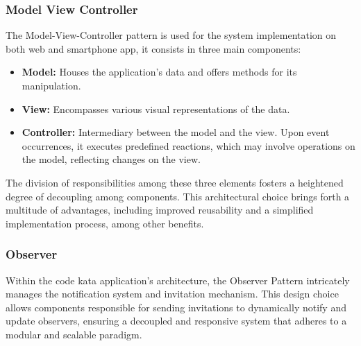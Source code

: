 \documentclass{article}
\begin{document}
\subsubsection{Model View Controller}
The Model-View-Controller pattern is used for the system implementation on both web and smartphone app, it consists in three main components:
\begin{itemize}
    \item \textbf{Model:} Houses the application's data and offers methods for its manipulation.
    \item \textbf{View:} Encompasses various visual representations of the data.
    \item \textbf{Controller:} Intermediary between the model and the view. Upon event occurrences, it executes predefined reactions, which may involve operations on the model, reflecting changes on the view.
\end{itemize}
The division of responsibilities among these three elements fosters a heightened degree of decoupling among components. This architectural choice brings forth a multitude of advantages, including improved reusability and a simplified implementation process, among other benefits.

\subsubsection{Observer}
Within the code kata application's architecture, the Observer Pattern intricately manages the notification system and invitation mechanism. This design choice allows components responsible for sending invitations to dynamically notify and update observers, ensuring a decoupled and responsive system that adheres to a modular and scalable paradigm.
\end{document}
